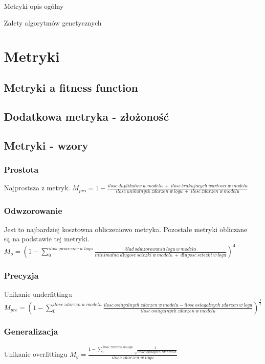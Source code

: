 Metryki opis ogólny


Zalety algorytmów genetycznych 



\section{Metryki}
\label{sec:metryki}
\cite{doi:10.1142/S0218843014400012}
\subsection{Metryki a fitness function}
\subsection{Dodatkowa metryka - złożoność}
\subsection{Metryki - wzory}

\subsubsection{Prostota}
Najprostsza z metryk. \newline
$M_{pro} = 1 - \frac{ilosc\ duplikatow\ w\ modelu\ +\ ilosc\ brakujacych\ wartosci\ w\ modelu}{ilosc\ unikalnych\ zdarzen\ w\ logu\ +\ ilosc\ zdarzen\ w\ modelu}$
\subsubsection{Odwzorowanie}
Jest to najbardziej kosztowna obliczeniowo metryka. Pozostałe metryki obliczane są na podstawie tej metryki. \newline
$M_o = (1 - \sum_{0}^{ilosc\ procesow\ w\ logu} \frac{blad\ odwzorowania\ logu\ w\ modelu}{minimalna\ długosc\ sciezki\ w\ modelu\ +\ długosc\ sciezki\ w\ logu})^4$
\subsubsection{Precyzja}
Unikanie underfittingu \newline
$M_{pre} = (1 - \sum_{0}^{ilosc\ zdarzen\ w\ modelu} \frac{ilosc\ osiagalnych\ zdarzen\ w\ modelu - ilosc\ osiagalnych\ zdarzen\ w\ logu}{ilosc\ osiagalnych\ zdarzen\ w\ modelu})^{\frac{1}{3}} $
\subsubsection{Generalizacja}
Unikanie overfittingu \newline
$M_g = \frac{1 - \sum_{0}^{ilosc\ zdarzen\ w\ logu} \frac{1}{\sqrt{ilosc\ wystapien\ zdarzenia}}}{ilosc\ zdarzen\ w\ logu} $

